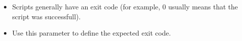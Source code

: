 
\begin{itemize}
\item Scripts generally have an exit code (for example, 0 usually means that the script was successfull).
\item Use this parameter to define the expected exit code. 
\end{itemize}
